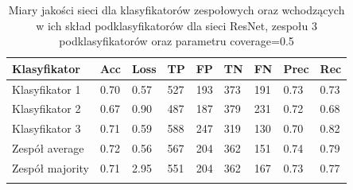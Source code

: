 \documentclass[polish,12pt]{aghthesis}
\begin{document}
 \begin{longtable}[h!]{|m{2.6cm}|m{1.2cm}|m{1.2cm}|m{1.2cm}|m{1.2cm}|m{1.2cm}|m{1.2cm}|m{1.2cm}|m{1.2cm}|}
 \hline
 Klasyfikator & Acc & Loss & TP & FP & TN & FN & Prec & Rec\\
 \hline
 Klasyfikator 1 & 0.70 & 0.57 & 527 & 193 & 373 & 191 & 0.73 & 0.73\\
 \hline
 Klasyfikator 2 & 0.67 & 0.90 & 487 & 187 & 379 & 231 & 0.72 & 0.68\\
 \hline
 Klasyfikator 3 & 0.71 & 0.59 & 588 & 247 & 319 & 130 & 0.70 & 0.82\\
 \hline
 Zespół average & 0.72 & 0.56 & 567 & 204 & 362 & 151 & 0.74 & 0.79\\ 
 \hline
 Zespół \newline majority & 0.71 & 2.95 & 551 & 204 & 362 & 167 & 0.73 & 0.77\\
 \hline
\caption{Miary jakości sieci dla klasyfikatorów zespołowych oraz wchodzących w ich skład podklasyfikatorów dla sieci ResNet, zespołu 3 podklasyfikatorów oraz parametru coverage=0.5}
\label{table:18}
\end{longtable}
\end{document}
